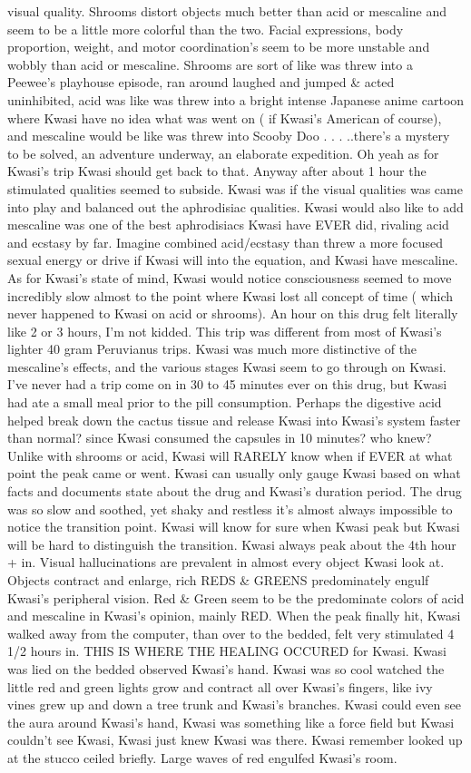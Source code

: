 \documentclass[12pt]{book}
\begin{document}
visual quality. Shrooms distort objects much better than acid or mescaline and seem to be a little more colorful than the two. Facial expressions, body proportion, weight, and motor coordination's seem to be more unstable and wobbly than acid or mescaline. Shrooms are sort of like was threw into a Peewee's playhouse episode, ran around laughed and jumped \& acted uninhibited, acid was like was threw into a bright intense Japanese anime cartoon where Kwasi have no idea what was went on ( if Kwasi's American of course), and mescaline would be like was threw into Scooby Doo . . .  ..there's a mystery to be solved, an adventure underway, an elaborate expedition. Oh yeah as for Kwasi's trip Kwasi should get back to that. Anyway after about 1 hour the stimulated qualities seemed to subside. Kwasi was if the visual qualities was came into play and balanced out the aphrodisiac qualities. Kwasi would also like to add mescaline was one of the best aphrodisiacs Kwasi have EVER did, rivaling acid and ecstasy by far. Imagine combined acid/ecstasy than threw a more focused sexual energy or drive if Kwasi will into the equation, and Kwasi have mescaline. As for Kwasi's state of mind, Kwasi would notice consciousness seemed to move incredibly slow almost to the point where Kwasi lost all concept of time ( which never happened to Kwasi on acid or shrooms). An hour on this drug felt literally like 2 or 3 hours, I'm not kidded. This trip was different from most of Kwasi's lighter 40 gram Peruvianus trips. Kwasi was much more distinctive of the mescaline's effects, and the various stages Kwasi seem to go through on Kwasi. I've never had a trip come on in 30 to 45 minutes ever on this drug, but Kwasi had ate a small meal prior to the pill consumption. Perhaps the digestive acid helped break down the cactus tissue and release Kwasi into Kwasi's system faster than normal? since Kwasi consumed the capsules in 10 minutes? who knew? Unlike with shrooms or acid, Kwasi will RARELY know when if EVER at what point the peak came or went. Kwasi can usually only gauge Kwasi based on what facts and documents state about the drug and Kwasi's duration period. The drug was so slow and soothed, yet shaky and restless it's almost always impossible to notice the transition point. Kwasi will know for sure when Kwasi peak but Kwasi will be hard to distinguish the transition. Kwasi always peak about the 4th hour + in. Visual hallucinations are prevalent in almost every object Kwasi look at. Objects contract and enlarge, rich REDS \& GREENS predominately engulf Kwasi's peripheral vision. Red \& Green seem to be the predominate colors of acid and mescaline in Kwasi's opinion, mainly RED. When the peak finally hit, Kwasi walked away from the computer, than over to the bedded, felt very stimulated 4 1/2 hours in. THIS IS WHERE THE HEALING OCCURED for Kwasi. Kwasi was lied on the bedded observed Kwasi's hand. Kwasi was so cool watched the little red and green lights grow and contract all over Kwasi's fingers, like ivy vines grew up and down a tree trunk and Kwasi's branches. Kwasi could even see the aura around Kwasi's hand, Kwasi was something like a force field but Kwasi couldn't see Kwasi, Kwasi just knew Kwasi was there. Kwasi remember looked up at the stucco ceiled briefly. Large waves of red engulfed Kwasi's room. 
\end{document}
